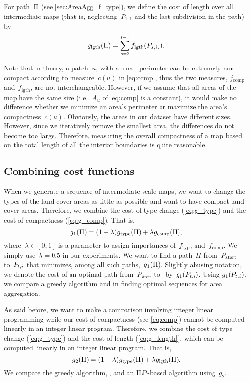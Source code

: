 \documentclass[acmsmall,natbib=false]{acmart}
\begin{document}
For path~$\Pi$ (see \sect\ref{sec:AreaAgg_f_type}), 
we define the cost of length over all 
intermediate maps 
(that is, neglecting~$P_{1,1}$ 
and the last subdivision in the path) by
\begin{equation}
\label{eq:g_length}
g_\mathrm{lgth}(\Pi)=
\sum_{s=2}^{t-1}f_{\mathrm{lgth}}(P_{s,i_s}).
\end{equation}

Note that in theory, a patch, $u$, with a small perimeter 
can be extremely non-compact 
according to measure~$c(u)$ in \eq\ref{eq:comp}, 
thus the two measures, $f_\mathrm{comp}$ and~$f_\mathrm{lgth}$, 
are not interchangeable. 
However, if we assume that all areas of the map have the same size 
(i.e., $A_u$ of \eq\ref{eq:comp} is a constant), 
it would make no difference whether 
we minimize an area's perimeter 
or maximize the area's compactness~$c(u)$. 
Obviously, the areas in our dataset have different sizes. 
However, since we iteratively remove the smallest area, 
the differences do not become too large. 
Therefore, measuring the overall compactness of a map 
based on the total length of all the interior boundaries is quite reasonable.


\subsection{Combining cost functions}
\label{sec:AreaAgg_Combining}

When we generate a sequence of intermediate-scale maps,
we want to change the types of the land-cover areas 
as little as possible
and want to have compact land-cover areas.
Therefore, we combine 
the cost of type change (\eq\ref{eq:g_type})
and the cost of compactness (\eq\ref{eq:g_comp}).
That is,
\begin{equation}
\label{eq:g_1}
g_1(\Pi)= (1-\lambda)g_\mathrm{type}(\Pi)
+\lambda g_\mathrm{comp}(\Pi),
\end{equation}
where~$\lambda \in [0,1]$ is a parameter 
to assign importances 
of~$f_\mathrm{type}$ and~$f_\mathrm{comp}$.
We simply use~$\lambda=0.5$ in our experiments. 
We want to find a path~$\Pi$ from~$P_\mathrm{start}$ to~$P_{t,i}$ 
that minimizes, among all such paths,~$g_1(\Pi)$.
Slightly abusing notation, we denote the cost of
an optimal path from~${P}_{\mathrm{start}}$ to~\Pnode 
by~$g_1(P_{t,i})$.
Using $g_1(P_{t,i})$, we compare a greedy algorithm and \Astar
in finding optimal sequences for area aggregation.

As said before, we want to make a comparison involving
integer linear programming 
while our cost of compactness (see \eq\ref{eq:comp})
cannot be computed linearly in an integer linear program.
Therefore, we combine 
the cost of type change (\eq\ref{eq:g_type})
and the cost of length (\eq\ref{eq:g_length}),
which can be computed linearly in an integer linear program. 
That is,
\begin{equation}
\label{eq:g_2}
g_2(\Pi)= (1-\lambda)g_\mathrm{type}(\Pi)
+\lambda g_\mathrm{lgth}(\Pi).
\end{equation}
We compare the greedy algorithm, \Astar, and an ILP-based 
algorithm using~$g_2$.
\end{document}
